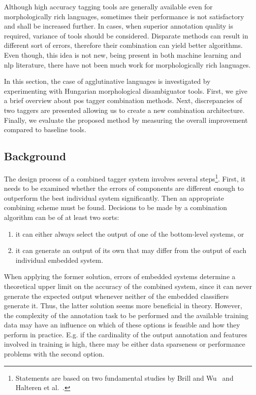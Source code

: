 Although high accuracy tagging tools are generally available even for morphologically rich languages, sometimes their performance is not satisfactory and shall be increased further.
In cases, when superior annotation quality is required, variance of tools should be considered.
Disparate methods can result in different sort of errors, therefore their combination can yield better algorithms.
Even though, this idea is not new, being present in both machine learning and \acrshort{nlp} literature, there have not been much work for morphologically rich languages. 

In this section, the case of agglutinative languages is investigated by experimenting with Hungarian morphological disambiguator tools.
First, we give a brief overview about \acrshort{pos} tagger combination methods.
Next, discrepancies of two taggers are presented allowing us to create a new combination architecture.
Finally, we evaluate the proposed method by measuring the overall improvement compared to baseline tools.

\subsection{Background}

The design process of a combined tagger system involves several steps\footnote{Statements are based on two fundamental studies by Brill and Wu~\cite{Brill1998} and Halteren et al.~\cite{Halteren2001}.}.
First, it needs to be examined whether the errors of components are different enough to outperform the best individual system significantly.
Then an appropriate combining scheme must be found.
Decisions to be made by a combination algorithm can be of at least two sorts: 
\begin{enumerate}
  \item it can either always select the output of one of the bottom-level systems, or 
  \item it can generate an output of its own that may differ from the output of each individual embedded system. 
\end{enumerate}

When applying the former solution, errors of embedded systems determine a theoretical upper limit on the accuracy of the combined system, since it can never generate the expected output whenever neither of the embedded classifiers generate it.
Thus, the latter solution seems more beneficial in theory.
However, the complexity of the annotation task to be performed and the available training data may have an influence on which of these options is feasible and how they perform in practice.
E.g. if the cardinality of the output annotation and features involved in training is high, there may be either data sparseness or performance problems with the second option.

